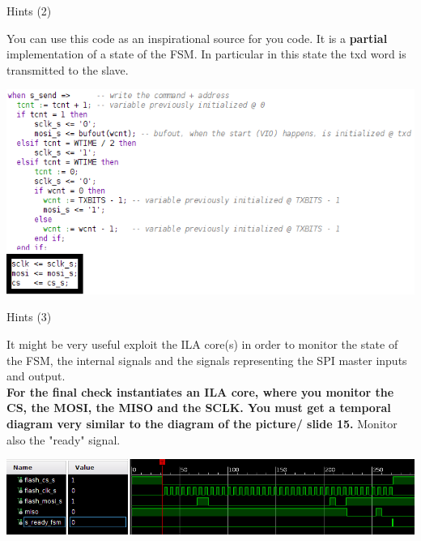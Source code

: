 \documentclass[ignorenonframetext,aspectratio=43,]{beamer}
\begin{document}
\begin{frame}{Hints (2)}
\protect\hypertarget{hints-2}{}

You can use this code as an inspirational source for you code. It is a
\textbf{partial} implementation of a state of the FSM. In particular in
this state the txd word is transmitted to the slave.

\includegraphics[width=1\textwidth,height=\textheight]{images/code}

\end{frame}

\begin{frame}{Hints (3)}
\protect\hypertarget{hints-3}{}

It might be very useful exploit the ILA core(s) in order to monitor the
state of the FSM, the internal signals and the signals representing the
SPI master inputs and output.\\
\textbf{For the final check instantiates an ILA core, where you monitor
the CS, the MOSI, the MISO and the SCLK. You must get a temporal diagram
very similar to the diagram of the picture/ slide 15.} Monitor also the
"ready" signal.

\includegraphics[width=1\textwidth,height=\textheight]{images/ila}

\end{frame}
\end{document}
